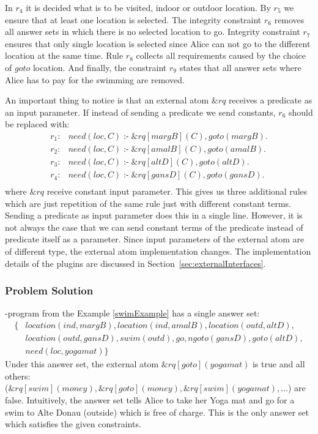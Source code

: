 \documentclass[a4paper, titlepage]{article}
\newcommand{\ext}[3]{\ensuremath{\&{#1}[#2](#3)}}
\DeclareMathOperator{\leftimpl}{:-}
\begin{document}
In $r_4$ it is decided what is to be visited, indoor or 
outdoor location. By $r_5$ we ensure that at least one location is selected. The integrity constraint $r_6$ removes all answer sets in which there is no selected location to go. Integrity constraint $r_7$ ensures that only single location is selected since Alice can not go to the different location at the same time. Rule $r_8$ collects all requirements caused by 
the choice of $\mathit{goto}$ location. And finally, the constraint $r_9$ states that all answer sets where 
Alice has to pay for the swimming are removed.

An important thing to notice is that an external atom 
$\mathit{\&rq}$ receives a predicate as an input parameter. If instead of sending a predicate we send 
constants, $r_6$ should be replaced with:
\begin{align*}
r_1\colon& need(loc, C) \leftimpl \ext{rq}{margB}{C}, 
goto(margB).\\
r_2\colon& need(loc, C) \leftimpl \ext{rq}{amalB}{C}, 
goto(amalB).\\
r_3\colon& need(loc, C) \leftimpl \ext{rq}{altD}{C}, 
goto(altD).\\
r_4\colon& need(loc, C) \leftimpl \ext{rq}{gansD}{C}, 
goto(gansD).\\
\end{align*}    
where $\&rq$ receive constant input parameter. This gives us three additional rules which are just 
repetition of the same rule just with different constant 
terms. Sending a predicate as input parameter does this in a 
single line. However, it is not always the case that we can send constant terms of the predicate instead of predicate itself  as a parameter. Since input parameters of the external atom are of different type, the external atom implementation changes. The implementation details of the plugins are discussed in Section~\ref{sec:externalInterfaces}.

\subsubsection{Problem Solution}
\hex{}-program from the Example \ref{swimExample} has a 
single answer set:
\begin{align*}
\{ & 
location(ind,margB),location(ind,amalB),location(outd,altD), 
\\
& location(outd,gansD), 
swim(outd),go,ngoto(gansD),goto(altD),\\
& need(loc,yogamat) \} 
\end{align*}
Under this answer set, the external atom $\ext{rq}{goto}
{yogamat}$ is true and all others:\\($\ext{rq}{swim}
{money}, \ext{rq}{goto}{money}, \ext{rq}{swim}{yogamat}, 
\dots $) are false. Intuitively, the answer set tells Alice to 
take her Yoga mat and go for a swim to Alte Donau (outside) 
which is free of charge. This is the only answer set which 
satisfies the given constraints.    
\end{document}
